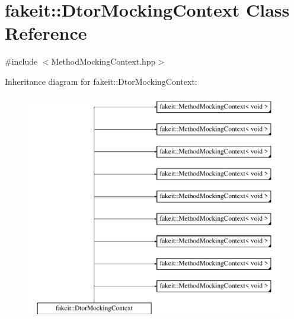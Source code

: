 \hypertarget{classfakeit_1_1DtorMockingContext}{}\section{fakeit\+::Dtor\+Mocking\+Context Class Reference}
\label{classfakeit_1_1DtorMockingContext}


{\ttfamily \#include $<$Method\+Mocking\+Context.\+hpp$>$}

Inheritance diagram for fakeit\+::Dtor\+Mocking\+Context\+:\begin{figure}[H]
\begin{center}
\leavevmode
\includegraphics[height=10.000000cm]{classfakeit_1_1DtorMockingContext}
\end{center}
\end{figure}
